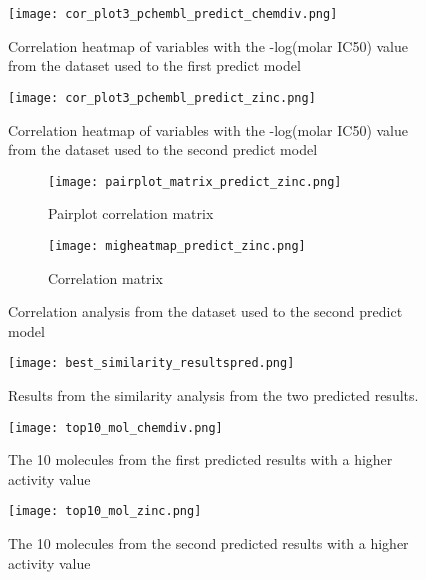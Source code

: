 \documentclass[final,times,twocolumn,article]{elsarticle}
\begin{document}
\begin{figure}[h]
    \centering 
     \texttt{[image: cor\_plot3\_pchembl\_predict\_chemdiv.png]}	
     \caption{Correlation heatmap of variables with the -log(molar IC50) value from the dataset used to the first predict model} 
     \label{Figure11}
 \end{figure}

 \begin{figure}[h]
    \centering 
     \texttt{[image: cor\_plot3\_pchembl\_predict\_zinc.png]}	
     \caption{Correlation heatmap of variables with the -log(molar IC50) value from the dataset used to the second predict model} 
     \label{Figure12}
 \end{figure}

 \begin{figure}[h]
    \begin{subfigure}{0.5\textwidth}
        \texttt{[image: pairplot\_matrix\_predict\_zinc.png]} 
        \caption{Pairplot correlation matrix}
    \end{subfigure}
    \begin{subfigure}{0.5\textwidth}
        \texttt{[image: migheatmap\_predict\_zinc.png]}
        \caption{Correlation matrix}
    \end{subfigure}
    
    \caption{Correlation analysis from the dataset used to the second predict model}
    \label{Figure13}
\end{figure}

 \begin{figure}[h]
    \centering 
     \texttt{[image: best\_similarity\_resultspred.png]}	
     \caption{Results from the similarity analysis from the two predicted results.} 
     \label{Figure14}
 \end{figure}

 \begin{figure*}[h]
    \centering 
     \texttt{[image: top10\_mol\_chemdiv.png]}	
     \caption{The 10 molecules from the first predicted results with a higher activity value} 
     \label{Figure15}
 \end{figure*}

 \begin{figure*}[h]
    \centering 
     \texttt{[image: top10\_mol\_zinc.png]}	
     \caption{The 10 molecules from the second predicted results with a higher activity value} 
     \label{Figure16}
 \end{figure*}
\end{document}
